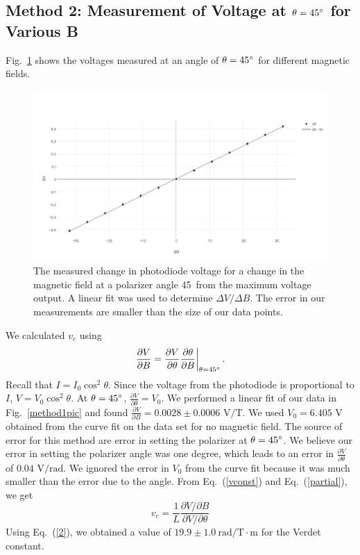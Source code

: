 \documentclass[prb,preprint]{revtex4-1}
\begin{document}
{\subsection{Method 2: Measurement of Voltage at $\theta = 45\degree$ for Various B}
{Fig.~\ref{method2pic} shows the voltages measured at an angle of $\theta=45\degree$ for different magnetic fields. 
\begin{figure}
\includegraphics[width =6.3in]{verdetpic2.pdf}
\caption{\label{method2pic} The measured change in photodiode voltage for a change in the magnetic field at a polarizer angle 45\degree\  from the maximum voltage output. A linear fit was used to determine $\Delta V/\Delta B$. The error in our measurements are smaller than the size of our data points.}
\end{figure}
We calculated $v_c$ using 
\begin{equation}
\label{partial}
\left. \frac{\partial V}{\partial B}=\frac{\partial V}{\partial \theta} \frac{\partial \theta}{\partial B}\right|_{\theta=45\degree}.
\end{equation}
Recall that $I=I_{0}\cos^2{\theta}$. Since the voltage from the photodiode is proportional to $I$, $V=V_{0}\cos^2{\theta}$. At $\theta = 45\degree$, $\frac{\partial V}{\partial \theta}=V_0$. 
We performed a linear fit of our data in Fig.~\ref{method1pic} and found $\frac{\partial V}{\partial B}=0.0028\pm 0.0006 \textrm{~V/T}$. We used $V_0=6.405$ V obtained from the curve fit on the data set for no magnetic field. 
The source of error for this method are error in setting the polarizer at $\theta=45\degree$. We believe our error in setting the polarizer angle was one degree, which leads to an error in $\frac{\partial V}{\partial \theta}$ of $0.04\textrm{~V/rad}$. 
We ignored the error in $V_0$ from the curve fit because it was much smaller than the error due to the angle.
From Eq.~(\ref{vconst}) and Eq.~(\ref{partial}), we get
\begin{equation}
\label{2}
v_c =\frac{1}{L}  \frac{\partial V/\partial B}{\partial V/\partial \theta} 
\end{equation}
Using  Eq.~(\ref{2}), we obtained a value of $19.9 \pm 1.0 \mathrm{~rad/T} \cdot \textrm{m}$ for the Verdet constant. }

}
\end{document}
